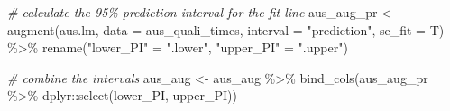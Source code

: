 \documentclass[
]{book}
\newenvironment{Shaded}{\begin{snugshade}}{\end{snugshade}}
\newcommand{\AttributeTok}[1]{\textcolor[rgb]{0.77,0.63,0.00}{#1}}
\newcommand{\CommentTok}[1]{\textcolor[rgb]{0.56,0.35,0.01}{\textit{#1}}}
\newcommand{\FunctionTok}[1]{\textcolor[rgb]{0.00,0.00,0.00}{#1}}
\newcommand{\NormalTok}[1]{#1}
\newcommand{\OtherTok}[1]{\textcolor[rgb]{0.56,0.35,0.01}{#1}}
\newcommand{\SpecialCharTok}[1]{\textcolor[rgb]{0.00,0.00,0.00}{#1}}
\newcommand{\StringTok}[1]{\textcolor[rgb]{0.31,0.60,0.02}{#1}}
\begin{document}
\begin{Shaded}
\begin{Highlighting}[]
\CommentTok{\# calculate the 95\% prediction interval for the fit line}
\NormalTok{aus\_aug\_pr }\OtherTok{\textless{}{-}} \FunctionTok{augment}\NormalTok{(aus.lm, }\AttributeTok{data =}\NormalTok{ aus\_quali\_times, }\AttributeTok{interval =} \StringTok{"prediction"}\NormalTok{, }\AttributeTok{se\_fit =}\NormalTok{ T) }\SpecialCharTok{\%\textgreater{}\%}
\FunctionTok{rename}\NormalTok{(}\StringTok{"lower\_PI"} \OtherTok{=} \StringTok{".lower"}\NormalTok{, }\StringTok{"upper\_PI"} \OtherTok{=} \StringTok{".upper"}\NormalTok{)}

\CommentTok{\# combine the intervals}
\NormalTok{aus\_aug }\OtherTok{\textless{}{-}}\NormalTok{ aus\_aug }\SpecialCharTok{\%\textgreater{}\%}
\FunctionTok{bind\_cols}\NormalTok{(aus\_aug\_pr }\SpecialCharTok{\%\textgreater{}\%}\NormalTok{ dplyr}\SpecialCharTok{::}\FunctionTok{select}\NormalTok{(lower\_PI, upper\_PI))}


\end{Highlighting}
\end{Shaded}
\end{document}
